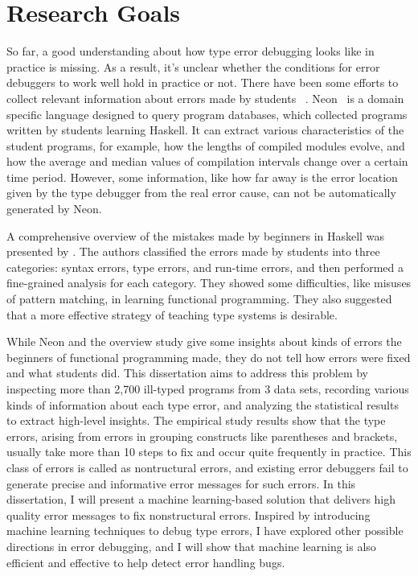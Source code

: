 \documentclass[12pt]{report}	%
\begin{document}


\section{Research Goals}

So far, a good understanding about how type error debugging looks like
in practice is missing. As a result, it's unclear whether the conditions
for error debuggers to work well hold in practice or not.
%
There have been some efforts to collect relevant
information about errors made by students
~\cite{Hage09:Neon,tirronen2015understanding,chambers2012function,fenwick2009another,denny2012all}.
Neon~\cite{Hage09:Neon} is a domain specific language designed to query
program databases, which collected programs written by students learning Haskell.
It can extract various characteristics of the student programs,
for example, how the lengths of compiled modules evolve,
and how the average and median values of compilation intervals
change over a certain time period.
However, some information, like how far away is 
the error location
given by the type debugger from the real error cause,
can not be automatically generated by Neon.

A comprehensive overview of the mistakes made by beginners in Haskell was presented by \cite{tirronen2015understanding}.
The authors classified the errors made by students into three
categories: syntax errors, type errors, and run-time errors,
and then performed a fine-grained analysis for each category.
They showed some difficulties, like misuses of pattern matching,
in learning functional programming.
They also suggested that a more effective strategy of teaching type systems
is desirable.


While Neon and the overview study give some insights about kinds of errors the beginners of
functional programming made, they do not tell how errors were fixed and what students did.
%
This dissertation aims to address this problem by inspecting more than 2,700
ill-typed programs from 3 data sets,
recording various kinds of information about each type error, 
and analyzing the statistical results to extract high-level insights.
%
The empirical study results show that the type errors, arising from errors in grouping constructs like parentheses and brackets,
usually take more than 10 steps to fix and occur quite frequently in practice.
This class of errors is called as nontructural errors,
and existing error debuggers fail to generate precise and informative error messages for such errors.
In this dissertation, I will present a machine learning-based solution that delivers high quality error messages to fix nonstructural errors.
%
Inspired by introducing machine learning techniques to debug type errors,
I have explored other possible directions in error debugging,
and I will show that machine learning is also efficient and effective to help detect error handling bugs.
\end{document}
